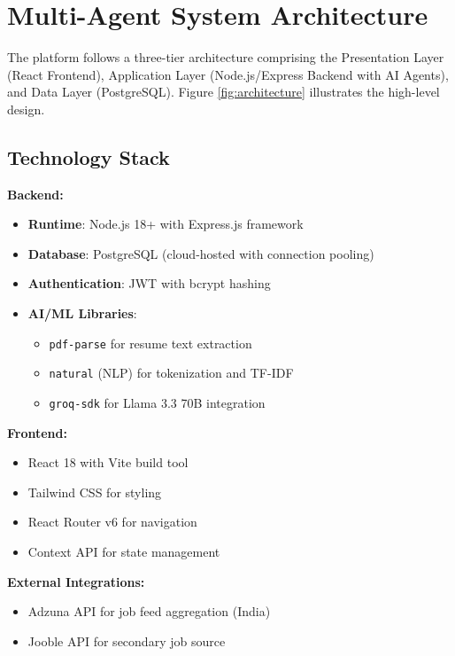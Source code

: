 \documentclass[conference]{IEEEtran}
\begin{document}
\section{Multi-Agent System Architecture}

The platform follows a three-tier architecture comprising the Presentation Layer (React Frontend), Application Layer (Node.js/Express Backend with AI Agents), and Data Layer (PostgreSQL). Figure \ref{fig:architecture} illustrates the high-level design.

\subsection{Technology Stack}

\textbf{Backend:}
\begin{itemize}
    \item \textbf{Runtime}: Node.js 18+ with Express.js framework
    \item \textbf{Database}: PostgreSQL (cloud-hosted with connection pooling)
    \item \textbf{Authentication}: JWT with bcrypt hashing
    \item \textbf{AI/ML Libraries}: 
    \begin{itemize}
        \item \texttt{pdf-parse} for resume text extraction
        \item \texttt{natural} (NLP) for tokenization and TF-IDF
        \item \texttt{groq-sdk} for Llama 3.3 70B integration
    \end{itemize}
\end{itemize}

\textbf{Frontend:}
\begin{itemize}
    \item React 18 with Vite build tool
    \item Tailwind CSS for styling
    \item React Router v6 for navigation
    \item Context API for state management
\end{itemize}

\textbf{External Integrations:}
\begin{itemize}
    \item Adzuna API for job feed aggregation (India)
    \item Jooble API for secondary job source
\end{itemize}
\end{document}
